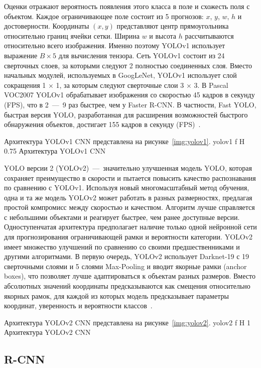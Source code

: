Оценки отражают вероятность появления этого класса в поле и схожесть поля с объектом.
Каждое ограничивающее поле состоит из 5 прогнозов: $x$, $y$, $w$, $h$ и достоверности.
Координаты $(x, y)$ представляют центр прямоугольника относительно границ ячейки сетки.
Ширина $w$ и высота $h$ рассчитываются относительно всего изображения.
Именно поэтому YOLOv1 использует выражение $B \times 5$ для вычисления тензора.
Сеть YOLOv1 состоит из 24 сверточных слоев, за которыми следуют 2 полностью соединенных слоя.
Вместо начальных модулей, используемых в GoogLeNet, YOLOv1 использует слой сокращения 1 $\times$ 1, за которым следуют сверточные слои 3 $\times$ 3.
В Pascal VOC2007 YOLOv1 обрабатывает изображения со скоростью 45 кадров в секунду (FPS), что в 2~---~9 раз быстрее, чем у Faster R-CNN.
В частности, Fast YOLO, быстрая версия YOLO, разработанная для расширения возможностей быстрого обнаружения объектов, достигает 155 кадров в секунду (FPS)~\cite{base, all}.

Архитектура YOLOv1 CNN представлена на рисунке~\ref{img:yolov1}.
	{yolov1}
	{f}
	{H}
	{0.75\textwidth}
	{Архитектура YOLOv1 CNN}

YOLO версии 2 (YOLOv2)~---~значительно улучшенная модель YOLO, которая сохраняет преимущество в скорости и пытается повысить качество распознавания по сравнению с YOLOv1.
Используя новый многомасштабный метод обучения, одна и та же модель YOLOv2 может работать в разных размерностях, предлагая простой компромисс между скоростью и качеством.
Алгоритм лучше справляется с небольшими объектами и реагирует быстрее, чем ранее доступные версии.
Одноступенчатая архитектура предполагает наличие только одной нейронной сети для прогнозирования ограничивающей рамки и вероятности категории.
YOLOv2 имеет множество улучшений по сравнению со своими предшественниками и другими алгоритмами.
В первую очередь, YOLOv2 использует Darknet-19 с 19 сверточными слоями и 5 слоями Max-Pooling и вводит якорные рамки (anchor boxes), что позволяет лучше адаптироваться к объектам разных размеров.
Вместо абсолютных значений координаты предсказываются как смещения относительно якорных рамок, для каждой из которых модель предсказывает параметры координат, уверенность и вероятности классов~\cite{yolochina, yolobase}.

Архитектура YOLOv2 CNN представлена на рисунке~\ref{img:yolov2}.
	{yolov2}
	{f}
	{H}
	{1\textwidth}
	{Архитектура YOLOv2 CNN}

\subsection{R-CNN}

